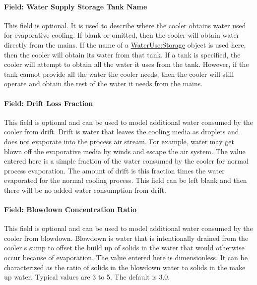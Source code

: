 \paragraph{Field: Water Supply Storage Tank Name}\label{field-water-supply-storage-tank-name-1}

This field is optional. It is used to describe where the cooler obtains water used for evaporative cooling. If blank or omitted, then the cooler will obtain water directly from the mains. If the name of a \hyperref[waterusestorage]{WaterUse:Storage} object is used here, then the cooler will obtain its water from that tank. If a tank is specified, the cooler will attempt to obtain all the water it uses from the tank. However, if the tank cannot provide all the water the cooler needs, then the cooler will still operate and obtain the rest of the water it needs from the mains.

\paragraph{Field: Drift Loss Fraction}\label{field-drift-loss-fraction}

This field is optional and can be used to model additional water consumed by the cooler from drift. Drift is water that leaves the cooling media as droplets and does not evaporate into the process air stream. For example, water may get blown off the evaporative media by winds and escape the air system. The value entered here is a simple fraction of the water consumed by the cooler for normal process evaporation. The amount of drift is this fraction times the water evaporated for the normal cooling process. This field can be left blank and then there will be no added water consumption from drift.

\paragraph{Field: Blowdown Concentration Ratio}\label{field-blowdown-concentration-ratio-000}

This field is optional and can be used to model additional water consumed by the cooler from blowdown. Blowdown is water that is intentionally drained from the cooler s sump to offset the build up of solids in the water that would otherwise occur because of evaporation. The value entered here is dimensionless. It can be characterized as the ratio of solids in the blowdown water to solids in the make up water. Typical values are 3 to 5. The default is 3.0.

